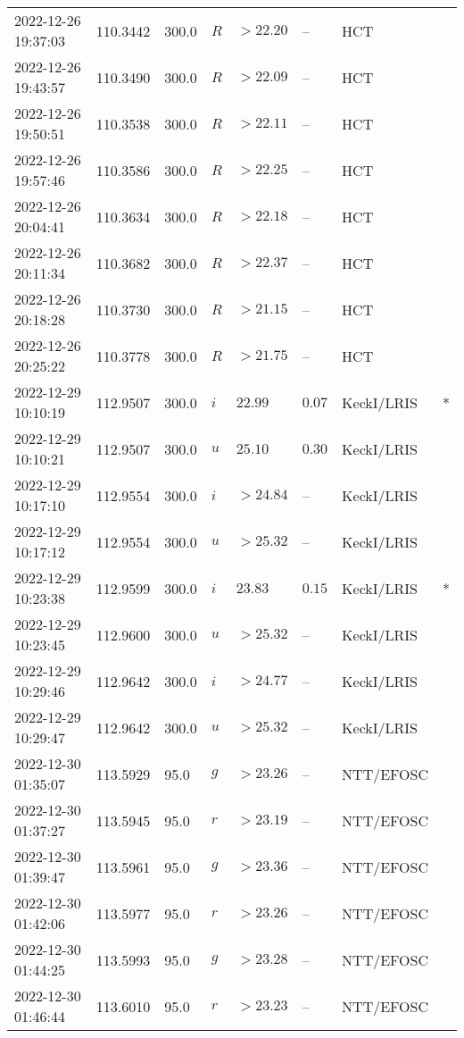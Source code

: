 \documentclass{nature_plusfigure}
\begin{document}
\begin{supplement}
\begin{center}
\begin{longtable}{llllllll}
2022-12-26 19:37:03 & 110.3442 & 300.0 & $R$ & $>22.20$ & -- & HCT &  \\ 
2022-12-26 19:43:57 & 110.3490 & 300.0 & $R$ & $>22.09$ & -- & HCT &  \\ 
2022-12-26 19:50:51 & 110.3538 & 300.0 & $R$ & $>22.11$ & -- & HCT &  \\ 
2022-12-26 19:57:46 & 110.3586 & 300.0 & $R$ & $>22.25$ & -- & HCT &  \\ 
2022-12-26 20:04:41 & 110.3634 & 300.0 & $R$ & $>22.18$ & -- & HCT &  \\ 
2022-12-26 20:11:34 & 110.3682 & 300.0 & $R$ & $>22.37$ & -- & HCT &  \\ 
2022-12-26 20:18:28 & 110.3730 & 300.0 & $R$ & $>21.15$ & -- & HCT &  \\ 
2022-12-26 20:25:22 & 110.3778 & 300.0 & $R$ & $>21.75$ & -- & HCT &  \\ 
2022-12-29 10:10:19 & 112.9507 & 300.0 & $i$ & $22.99$ & $0.07$ & KeckI/LRIS & * \\ 
2022-12-29 10:10:21 & 112.9507 & 300.0 & $u$ & $25.10$ & $0.30$ & KeckI/LRIS &  \\ 
2022-12-29 10:17:10 & 112.9554 & 300.0 & $i$ & $>24.84$ & -- & KeckI/LRIS &  \\ 
2022-12-29 10:17:12 & 112.9554 & 300.0 & $u$ & $>25.32$ & -- & KeckI/LRIS &  \\ 
2022-12-29 10:23:38 & 112.9599 & 300.0 & $i$ & $23.83$ & $0.15$ & KeckI/LRIS & * \\ 
2022-12-29 10:23:45 & 112.9600 & 300.0 & $u$ & $>25.32$ & -- & KeckI/LRIS &  \\ 
2022-12-29 10:29:46 & 112.9642 & 300.0 & $i$ & $>24.77$ & -- & KeckI/LRIS &  \\ 
2022-12-29 10:29:47 & 112.9642 & 300.0 & $u$ & $>25.32$ & -- & KeckI/LRIS &  \\ 
2022-12-30 01:35:07 & 113.5929 & 95.0 & $g$ & $>23.26$ & -- & NTT/EFOSC &  \\ 
2022-12-30 01:37:27 & 113.5945 & 95.0 & $r$ & $>23.19$ & -- & NTT/EFOSC &  \\ 
2022-12-30 01:39:47 & 113.5961 & 95.0 & $g$ & $>23.36$ & -- & NTT/EFOSC &  \\ 
2022-12-30 01:42:06 & 113.5977 & 95.0 & $r$ & $>23.26$ & -- & NTT/EFOSC &  \\ 
2022-12-30 01:44:25 & 113.5993 & 95.0 & $g$ & $>23.28$ & -- & NTT/EFOSC &  \\ 
2022-12-30 01:46:44 & 113.6010 & 95.0 & $r$ & $>23.23$ & -- & NTT/EFOSC &  \\ 

\end{longtable}
\end{center}
\end{supplement}
\end{document}
